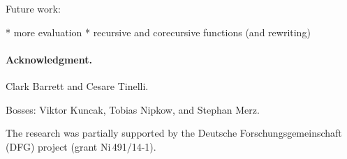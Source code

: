 \documentclass[a4paper,oribibl,envcountsame,draft]{llncs}
\begin{document}
Future work:

  * more evaluation
  * recursive and corecursive functions
    (and rewriting)

\def\ackname{Acknowledgment}
\paragraph{\ackname.}

Clark Barrett and Cesare Tinelli.

Bosses: Viktor Kuncak, Tobias Nipkow, and Stephan Merz.

The research was partially supported by the Deutsche
Forschungs\-gemein\-schaft (DFG) project
 (grant Ni\,491\slash 14-1).


{}
\end{document}
